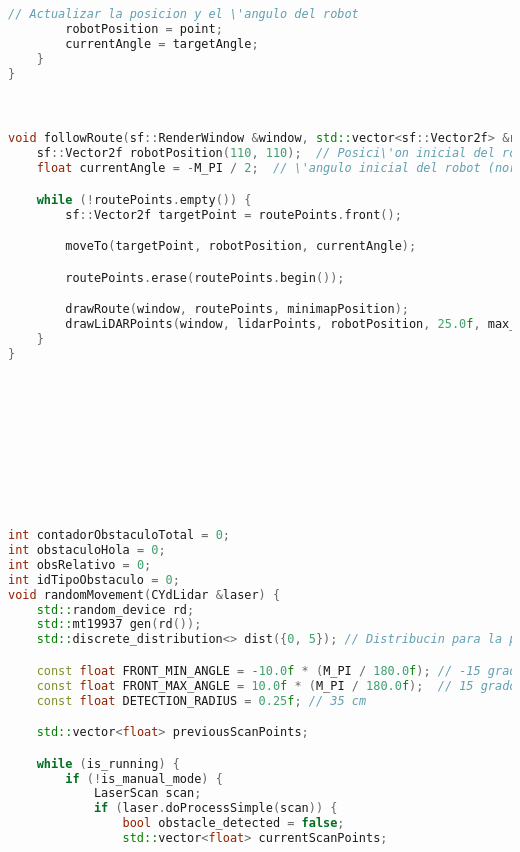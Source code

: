 \begin{lstlisting}[language={C++}, caption={Cuarto ajuste de c\'odigo}, label={CuartoAjuste}]
        // Actualizar la posicion y el \'angulo del robot
        robotPosition = point;
        currentAngle = targetAngle;
    }
}



void followRoute(sf::RenderWindow &window, std::vector<sf::Vector2f> &routePoints, const LaserScan &lidarPoints, const sf::Vector2f &minimapPosition, float max_range) {
    sf::Vector2f robotPosition(110, 110);  // Posici\'on inicial del robot en el minimapa
    float currentAngle = -M_PI / 2;  // \'angulo inicial del robot (norte en -90°)

    while (!routePoints.empty()) {
        sf::Vector2f targetPoint = routePoints.front();

        moveTo(targetPoint, robotPosition, currentAngle);

        routePoints.erase(routePoints.begin());

        drawRoute(window, routePoints, minimapPosition);
        drawLiDARPoints(window, lidarPoints, robotPosition, 25.0f, max_range);
    }
}










int contadorObstaculoTotal = 0;
int obstaculoHola = 0;
int obsRelativo = 0;
int idTipoObstaculo = 0;
void randomMovement(CYdLidar &laser) {
    std::random_device rd;
    std::mt19937 gen(rd());
    std::discrete_distribution<> dist({0, 5}); // Distribucin para la probabilidad de movimiento

    const float FRONT_MIN_ANGLE = -10.0f * (M_PI / 180.0f); // -15 grados en radaianes
    const float FRONT_MAX_ANGLE = 10.0f * (M_PI / 180.0f);  // 15 grados en radianes
    const float DETECTION_RADIUS = 0.25f; // 35 cm

    std::vector<float> previousScanPoints;

    while (is_running) {
        if (!is_manual_mode) {
            LaserScan scan;
            if (laser.doProcessSimple(scan)) {
                bool obstacle_detected = false;
                std::vector<float> currentScanPoints;
                

\end{lstlisting}
